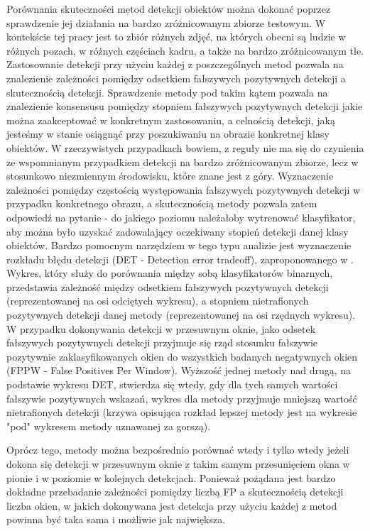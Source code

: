 Porównania skuteczności metod detekcji obiektów można dokonać poprzez
sprawdzenie jej działania na bardzo zróżnicowanym zbiorze testowym. W
kontekście tej pracy jest to zbiór różnych zdjęć, na których obecni są
ludzie w różnych pozach, w różnych częściach kadru, a także na
bardzo zróżnicowanym tle. Zastosowanie detekcji przy użyciu każdej z
poszczególnych metod pozwala na znalezienie zależności pomiędzy
odsetkiem fałszywych pozytywnych detekcji a skutecznością detekcji.
Sprawdzenie metody pod takim kątem pozwala na znalezienie konsensusu
pomiędzy stopniem fałszywych pozytywnych detekcji jakie można zaakceptować w konkretnym zastosowaniu, a celnością detekcji, jaką jesteśmy w stanie osiągnąć przy poszukiwaniu na obrazie konkretnej klasy obiektów. W rzeczywistych przypadkach bowiem,
z reguły nie ma się do czynienia ze wspomnianym przypadkiem detekcji na bardzo
zróżnicowanym zbiorze, lecz w stosunkowo niezmiennym środowisku, które
znane jest z góry. Wyznaczenie zależności pomiędzy częstością
występowania fałszywych pozytywnych detekcji w przypadku konkretnego
obrazu, a skutecznością metody pozwala zatem odpowiedź na pytanie - do
jakiego poziomu należałoby wytrenować klasyfikator, aby można było
uzyskać zadowalający oczekiwany stopień detekcji danej klasy obiektów.
Bardzo pomocnym narzędziem w tego typu analizie jest wyznaczenie
rozkładu błędu detekcji (DET - Detection error tradeoff), zaproponowanego w \cite{Martin97thedet}. Wykres, który służy do porównania między sobą klasyfikatorów binarnych, przedstawia zależność między odsetkiem fałszywych pozytywnych detekcji (reprezentowanej na osi odciętych wykresu), a stopniem nietrafionych pozytywnych detekcji danej metody (reprezentowanej na osi rzędnych wykresu). W przypadku dokonywania detekcji w przesuwnym oknie, jako odsetek fałszywych pozytywnych detekcji przyjmuje się rząd stosunku fałszywie pozytywnie zaklasyfikowanych okien do wszystkich badanych negatywnych okien (FPPW - False Positives Per Window). Wyższość jednej metody nad drugą, na podstawie wykresu DET, stwierdza się wtedy, gdy dla tych samych wartości fałszywie pozytywnych wskazań, wykres dla metody przyjmuje mniejszą wartość nietrafionych detekcji (krzywa opisująca rozkład lepszej metody jest na wykresie "pod" wykresem metody uznawanej za gorszą).

Oprócz tego, metody można bezpośrednio porównać wtedy i tylko wtedy
jeżeli dokona się detekcji w przesuwnym oknie z takim samym
przesunięciem okna w pionie i w poziomie w kolejnych detekcjach.
Ponieważ pożądana jest bardzo dokładne przebadanie zależności pomiędzy liczbą
FP a skutecznością detekcji liczba okien, w jakich
dokonywana jest detekcja przy użyciu każdej z metod powinna być taka
sama i możliwie jak największa.


